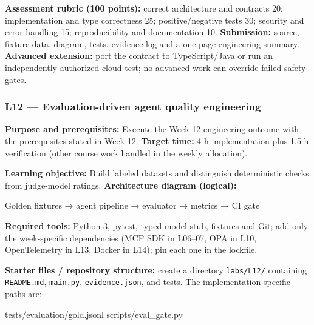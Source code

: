 \documentclass[
  10pt,
]{article}
\newenvironment{Shaded}{\begin{snugshade}}{\end{snugshade}}
\newcommand{\NormalTok}[1]{#1}
\begin{document}
\textbf{Assessment rubric (100 points):} correct architecture and
contracts 20; implementation and type correctness 25; positive/negative
tests 30; security and error handling 15; reproducibility and
documentation 10. \textbf{Submission:} source, fixture data, diagram,
tests, evidence log and a one-page engineering summary. \textbf{Advanced
extension:} port the contract to TypeScript/Java or run an independently
authorized cloud test; no advanced work can override failed safety
gates.

\subsubsection{L12 --- Evaluation-driven agent quality
engineering}\label{l12-evaluation-driven-agent-quality-engineering}

\textbf{Purpose and prerequisites:} Execute the Week 12 engineering
outcome with the prerequisites stated in Week 12. \textbf{Target time:}
4 h implementation plus 1.5 h verification (other course work handled in
the weekly allocation).

\textbf{Learning objective:} Build labeled datasets and distinguish
deterministic checks from judge-model ratings. \textbf{Architecture
diagram (logical):}

\begin{Shaded}
\begin{Highlighting}[]
\NormalTok{Golden fixtures → agent pipeline → evaluator → metrics}
\NormalTok{→ CI gate}
\end{Highlighting}
\end{Shaded}

\textbf{Required tools:} Python 3, pytest, typed model stub, fixtures
and Git; add only the week-specific dependencies (MCP SDK in L06--07,
OPA in L10, OpenTelemetry in L13, Docker in L14); pin each one in the
lockfile.

{\raggedright \textbf{Starter files / repository structure:} create a directory
\texttt{labs/\allowbreak L12/} containing \texttt{README.md}, \texttt{main.py},
\texttt{evidence.json}, and tests. The implementation-specific paths
are:\par}

\begin{Shaded}
\begin{Highlighting}[]
\NormalTok{tests/evaluation/gold.jsonl}
\NormalTok{scripts/eval\_gate.py}
\end{Highlighting}
\end{Shaded}
\end{document}
